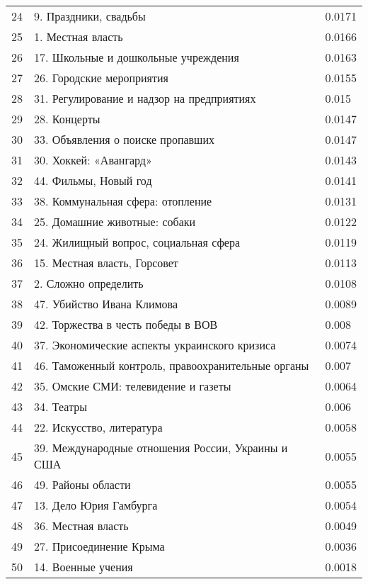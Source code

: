 \begin{longtable}[c]{| L{3cm} | C{7cm} | R{5cm} |}
24 & 9. Праздники, свадьбы & 0.0171 \\
25 & 1. Местная власть & 0.0166 \\
26 & 17. Школьные и дошкольные учреждения & 0.0163 \\
27 & 26. Городские мероприятия & 0.0155 \\
28 & 31. Регулирование и надзор на предприятиях & 0.015 \\
29 & 28. Концерты & 0.0147 \\
30 & 33. Объявления о поиске пропавших & 0.0147 \\
31 & 30. Хоккей: «Авангард» & 0.0143 \\
32 & 44. Фильмы, Новый год & 0.0141 \\
33 & 38. Коммунальная сфера: отопление & 0.0131 \\
34 & 25. Домашние животные: собаки & 0.0122 \\
35 & 24. Жилищный вопрос, социальная сфера & 0.0119 \\
36 & 15. Местная власть, Горсовет & 0.0113 \\
37 & 2. Сложно определить & 0.0108 \\
38 & 47. Убийство Ивана Климова & 0.0089 \\
39 & 42. Торжества в честь победы в ВОВ & 0.008 \\
40 & 37. Экономические аспекты украинского кризиса & 0.0074 \\
41 & 46. Таможенный контроль, правоохранительные органы & 0.007 \\
42 & 35. Омские СМИ: телевидение и газеты & 0.0064 \\
43 & 34. Театры & 0.006 \\
44 & 22. Искусство, литература & 0.0058 \\
45 & 39. Международные отношения России, Украины и США & 0.0055 \\
46 & 49. Районы области & 0.0055 \\
47 & 13. Дело Юрия Гамбурга & 0.0054 \\
48 & 36. Местная власть & 0.0049 \\
49 & 27. Присоединение Крыма & 0.0036 \\
50 & 14. Военные учения & 0.0018 \\
	\hline
\end{longtable}

